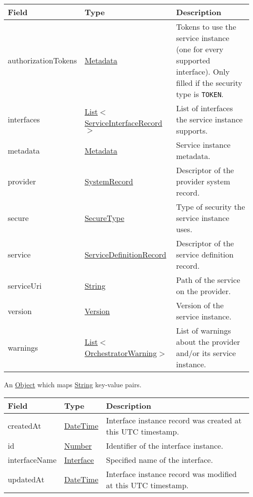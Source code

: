 \documentclass[a4paper]{arrowhead}
\newcommand{\pref}[1]{{\textcolor{ArrowheadGrey}{\hyperref[sec:model:primitives:#1]{#1}}}}
\begin{document}
\begin{table}[ht!]
\begin{tabularx}{\textwidth}{| p{4cm} | p{4.5cm} | X |} \hline
\rowcolor{gray!33} Field & Type & Description \\ \hline
authorizationTokens & \hyperref[sec:model:Metadata]{Metadata} & Tokens to use the service instance (one for every supported interface). Only filled if the security type is \texttt{TOKEN}. \\ \hline
interfaces & \pref{List}$<$\hyperref[sec:model:ServiceInterfaceRecord]{ServiceInterfaceRecord}$>$ & List of interfaces the service instance supports. \\ \hline
metadata & \hyperref[sec:model:Metadata]{Metadata} & Service instance metadata. \\ \hline
provider & \hyperref[sec:model:SystemRecord]{SystemRecord} & Descriptor of the provider system record. \\ \hline
secure & \pref{SecureType} & Type of security the service instance uses. \\ \hline
service & \hyperref[sec:model:ServiceDefinitionRecord]{ServiceDefinitionRecord} & Descriptor of the service definition record. \\ \hline
serviceUri & \pref{String} & Path of the service on the provider. \\ \hline
version & \pref{Version} & Version of the service instance. \\ \hline
warnings & \pref{List}$<$\pref{OrchestratorWarning}$>$ & List of warnings about the provider and/or its service instance. \\ \hline

\end{tabularx}
\end{table}

\label{sec:model:Metadata}

An \pref{Object} which maps \pref{String} key-value pairs.

\clearpage

\label{sec:model:ServiceInterfaceRecord}

\begin{table}[ht!]
\begin{tabularx}{\textwidth}{| p{4.25cm} | p{3.5cm} | X |} \hline
\rowcolor{gray!33} Field & Type & Description \\ \hline
createdAt & \pref{DateTime} & Interface instance record was created at this UTC time\-stamp. \\ \hline
id & \pref{Number} & Identifier of the interface instance. \\ \hline
interfaceName &\pref{Interface} & Specified name of the interface. \\ \hline
updatedAt & \pref{DateTime} & Interface instance record was modified at this UTC time\-stamp. \\ \hline
\end{tabularx}
\end{table}
\end{document}
